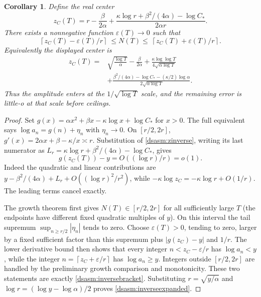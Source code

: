 \documentclass[11pt,letterpaper]{article}
\newtheorem{corollary}[theorem]{Corollary}
\theoremstyle{remark}\newtheorem{remark}[theorem]{Remark}
\newcommand{\eps}{\varepsilon}\newcommand{\HH}{\mathcal H}\newcommand{\one}{\mathbf1}
\newcommand{\ceil}[1]{\left\lceil#1\right\rceil}
\begin{document}
\begin{corollary}\label{dsasm:cor:inverse}
Define the real center
\begin{equation}\label{dsasm:zinverse}
 z_C(T)=r-\frac{\beta}{2\alpha}
       +\frac{\kappa\log r+\beta^2/(4\alpha)-\log C_*}{2\alpha r}.
\end{equation}
There exists a nonnegative function $\eps(T)\to0$ such that
\begin{equation}\label{dsasm:inversebracket}
 \ceil{z_C(T)-\eps(T)/r}\ \le N(T)\le\ \ceil{z_C(T)+\eps(T)/r}.
\end{equation}
Equivalently the displayed center is
\begin{align}\label{dsasm:inverseexpanded}
 z_C(T)={}&\sqrt{\frac{\log T}{\alpha}}-\frac{\beta}{2\alpha}
 +\frac{\kappa\log\log T}{4\sqrt{\alpha\log T}}\nonumber\\
 &+\frac{\beta^2/(4\alpha)-\log C_*-(\kappa/2)\log\alpha}
             {2\sqrt{\alpha\log T}}.
\end{align}
Thus the amplitude enters at the $1/\sqrt{\log T}$ scale, and the
remaining error is little-o at that scale before ceilings.
\end{corollary}
\begin{proof}
Set $g(x)=\alpha x^2+\beta x-\kappa\log x+\log C_*$ for $x>0$.
The full equivalent says $\log a_n=g(n)+\eta_n$ with $\eta_n\to0$.
On $[r/2,2r]$, $g'(x)=2\alpha x+\beta-\kappa/x\asymp r$.
Substitution of \eqref{dsasm:zinverse}, writing its last numerator as
$L_r=\kappa\log r+\beta^2/(4\alpha)-\log C_*$, gives
\[
 g(z_C(T))-y=O((\log r)/r)=o(1).
\]
Indeed the quadratic and linear contributions are
$y-\beta^2/(4\alpha)+L_r+O((\log r)^2/r^2)$,
while $-\kappa\log z_C=-\kappa\log r+O(1/r)$.
The leading terms cancel exactly.

The growth theorem first gives $N(T)\in[r/2,2r]$ for all sufficiently
large $T$ (the endpoints have different fixed quadratic multiples
of $y$). On this interval the tail supremum
$\sup_{n\ge r/2}|\eta_n|$ tends to zero.
Choose $\eps(T)>0$, tending to zero, larger by a fixed sufficient
factor than this supremum plus $|g(z_C)-y|$ and $1/r$.
The lower derivative bound then shows that every integer
$n<z_C-\eps/r$ has $\log a_n<y$, while the integer
$n=\ceil{z_C+\eps/r}$ has $\log a_n\ge y$.
Integers outside $[r/2,2r]$ are handled by the preliminary growth
comparison and monotonicity. These two statements are exactly
\eqref{dsasm:inversebracket}. Substituting $r=\sqrt{y/\alpha}$ and
$\log r=(\log y-\log\alpha)/2$ proves \eqref{dsasm:inverseexpanded}.
\end{proof}
\end{document}
